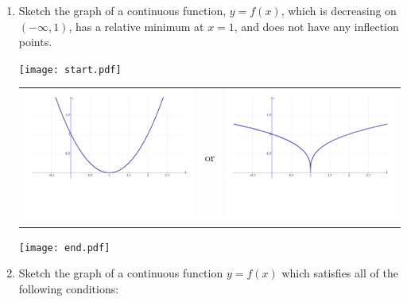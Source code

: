 \documentclass[12pt]{article}
\begin{document}
\begin{enumerate}
\item Sketch the graph of a continuous function, $y=f(x)$, which is decreasing on $(-\infty,1)$, has a relative minimum at $x=1$, and does not have any inflection points.

\texttt{[image: start.pdf]}
{{\begin{tabular}{ccc}
\includegraphics[scale=0.25]{graph2a.pdf} & or & \includegraphics[scale=0.25]{graph2b.pdf}
\end{tabular}
}}
\texttt{[image: end.pdf]}


\item Sketch the graph of a continuous function $y=f(x)$ which satisfies all of the following conditions:


\end{enumerate}
\end{document}
